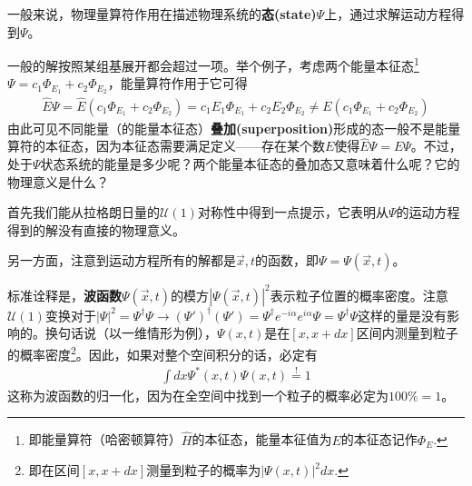 一般来说，物理量算符作用在描述物理系统的{\bfseries 态(state)}$\Psi$上，通过求解运动方程得到$\Psi$。

一般的解按照某组基展开都会超过一项。举个例子，考虑两个能量本征态\footnote{即能量算符（哈密顿算符）$\hat{H}$的本征态，能量本征值为$E$的本征态记作$\Phi_E$.}$\Psi = c_1 \Phi_{E_1} + c_2 \Phi_{E_2}$，能量算符作用于它可得
\begin{align}
\label{equ8.9}
	\hat{E}\Psi = \hat{E}(c_1\Phi_{E_1} + c_2\Phi_{E_2})=c_1E_1\Phi_{E_1}+c_2E_2\Phi_{E_2}\neq E(c_1\Phi_{E_1}+c_2\Phi_{E_2})
\end{align}
由此可见不同能量（的能量本征态）{\bfseries 叠加(superposition)}形成的态一般不是能量算符的本征态，因为本征态需要满足定义——存在某个数$E$使得$\hat{E}\Psi=E\Psi$。不过，处于$\Psi$状态系统的能量是多少呢？两个能量本征态的叠加态又意味着什么呢？它的物理意义是什么？

首先我们能从拉格朗日量的$\mathcal{U}(1)$对称性中得到一点提示，它表明从$\Psi$的运动方程得到的解没有直接的物理意义。

另一方面，注意到运动方程所有的解都是$\vec{x},t$的函数，即$\Psi=\Psi(\vec{x},t)$。

标准诠释是，{\bfseries 波函数}$\Psi(\vec{x},t)$的模方$|\Psi(\vec{x},t)|^2$表示粒子位置的概率密度。注意$\mathcal{U}(1)$变换对于$|\Psi|^2=\Psi^\dagger\Psi\to(\Psi')^\dagger(\Psi')=\Psi^\dagger e^{-i\alpha}e^{i\alpha}\Psi=\Psi^\dagger\Psi$这样的量是没有影响的。换句话说（以一维情形为例），$\Psi(x,t)$是在$[x, x+dx]$区间内测量到粒子的概率密度\footnote{即在区间$[x, x + dx]$测量到粒子的概率为$|\Psi(x, t)|^2 dx$.}。因此，如果对整个空间积分的话，必定有
\begin{align}
\label{equ8.10}
	\int dx\Psi^*(x,t)\Psi(x,t)\overset{!}{=}1
\end{align}
这称为波函数的归一化，因为在全空间中找到一个粒子的概率必定为$100\%=1$。

